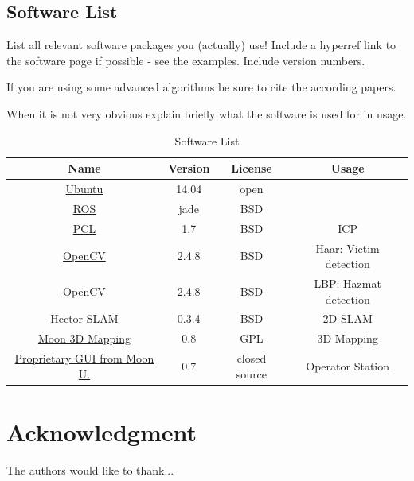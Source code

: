 \documentclass[journal]{IEEEtran}
\begin{document}
\subsection{Software List}
List all relevant software packages you (actually) use!
Include a hyperref link to the software page if possible - see the examples. Include version numbers.

If you are using some advanced algorithms be sure to cite the according papers.

When it is not very obvious explain briefly what the software is used for in usage.

\begin{table}
\renewcommand{\arraystretch}{1}
 \tabcolsep=0.1cm

\caption{Software List}
\label{tab:SoftwareList}
\centering
\begin{tabular}{|c|c|c|c|}
\hline
Name & Version & License & Usage \\
\hline
 \href{http://www.ubuntu.com}{Ubuntu} & 14.04 & open & \\
 \href{http://www.ros.org}{ROS} & jade & BSD & \\
 \href{http://www.pointclouds.org/}{PCL} \cite{Rusu_ICRA2011_PCL}& 1.7 & BSD & ICP \\
 \href{http://opencv.org/}{OpenCV} \cite{990517, 1038171} & 2.4.8 & BSD & Haar: Victim detection \\
 \href{http://opencv.org/}{OpenCV} \cite{Lee2007LBP} & 2.4.8 & BSD & LBP: Hazmat detection \\
 \href{http://wiki.ros.org/hector_slam}{Hector SLAM} \cite{KohlbrecherMeyerStrykKlingaufFlexibleSlamSystem2011} & 0.3.4 & BSD & 2D SLAM \\
 \href{http://robotics.moon.edu}{Moon 3D Mapping} & 0.8 & GPL & 3D Mapping \\
 \href{}{Proprietary GUI from Moon U.} & 0.7 & closed source & Operator Station \\
 
\hline
\end{tabular}
\end{table}




\section*{Acknowledgment}


The authors would like to thank...
\end{document}
